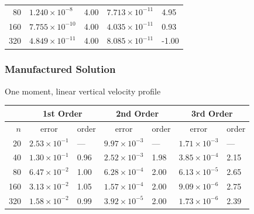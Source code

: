 \documentclass[10pt]{beamer}
\begin{document}
\begin{frame}
\begin{table}
\begin{tabular}{r*{4}l}
             80 & \( 1.240 \times 10^{-8}  \) & 4.00 & \( 7.713 \times 10^{-11} \) & 4.95 \\
            160 & \( 7.755 \times 10^{-10} \) & 4.00 & \( 4.035 \times 10^{-11} \) & 0.93 \\
            320 & \( 4.849 \times 10^{-11} \) & 4.00 & \( 8.085 \times 10^{-11} \) & -1.00 \\
            \bottomrule
          \end{tabular}
        \end{table}
    \end{frame}
    \begin{frame}
        \frametitle{Manufactured Solution}
        One moment, linear vertical velocity profile
        \footnotesize
        \begin{table}
          \centering
          \begin{tabular}{r*{6}l}
            \toprule
            & \multicolumn{2}{c}{1st Order} & \multicolumn{2}{c}{2nd Order} & \multicolumn{2}{c}{3rd Order} \\
            \midrule
            \(n\) & \multicolumn{1}{c}{error} & order & \multicolumn{1}{c}{error} & order & \multicolumn{1}{c}{error} & order\\
            \midrule
             20 & \( 2.53 \times 10^{-1} \) & ---  & \( 9.97 \times 10^{-3} \) & ---  & \( 1.71 \times 10^{-3} \) & ---  \\
             40 & \( 1.30 \times 10^{-1} \) & 0.96 & \( 2.52 \times 10^{-3} \) & 1.98 & \( 3.85 \times 10^{-4} \) & 2.15 \\
             80 & \( 6.47 \times 10^{-2} \) & 1.00 & \( 6.28 \times 10^{-4} \) & 2.00 & \( 6.13 \times 10^{-5} \) & 2.65 \\
            160 & \( 3.13 \times 10^{-2} \) & 1.05 & \( 1.57 \times 10^{-4} \) & 2.00 & \( 9.09 \times 10^{-6} \) & 2.75 \\
            320 & \( 1.58 \times 10^{-2} \) & 0.99 & \( 3.92 \times 10^{-5} \) & 2.00 & \( 1.73 \times 10^{-6} \) & 2.39 \\
            \bottomrule
          \end{tabular}
        \end{table}
        \begin{table}

\end{table}
\end{frame}
\end{document}
